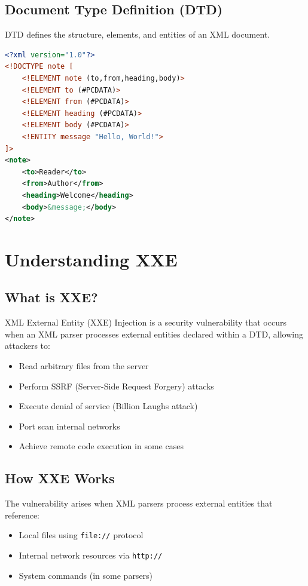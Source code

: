 \documentclass{article}
\begin{document}
\subsection{Document Type Definition (DTD)}
DTD defines the structure, elements, and entities of an XML document.

\begin{lstlisting}[language=XML, caption=DTD Example]
<?xml version="1.0"?>
<!DOCTYPE note [
    <!ELEMENT note (to,from,heading,body)>
    <!ELEMENT to (#PCDATA)>
    <!ELEMENT from (#PCDATA)>
    <!ELEMENT heading (#PCDATA)>
    <!ELEMENT body (#PCDATA)>
    <!ENTITY message "Hello, World!">
]>
<note>
    <to>Reader</to>
    <from>Author</from>
    <heading>Welcome</heading>
    <body>&message;</body>
</note>
\end{lstlisting}

\section{Understanding XXE}

\subsection{What is XXE?}
XML External Entity (XXE) Injection is a security vulnerability that occurs when an XML parser processes external entities declared within a DTD, allowing attackers to:
\begin{itemize}
    \item Read arbitrary files from the server
    \item Perform SSRF (Server-Side Request Forgery) attacks
    \item Execute denial of service (Billion Laughs attack)
    \item Port scan internal networks
    \item Achieve remote code execution in some cases
\end{itemize}


\subsection{How XXE Works}
The vulnerability arises when XML parsers process external entities that reference:
\begin{itemize}
    \item Local files using \texttt{file://} protocol
    \item Internal network resources via \texttt{http://}
    \item System commands (in some parsers)
\end{itemize}
\end{document}
